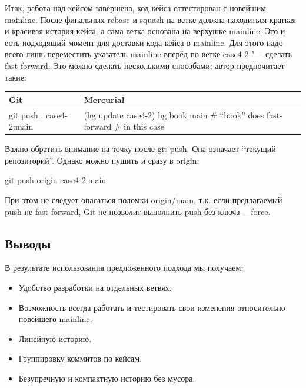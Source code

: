 \documentclass[10pt, a5paper]{article}
\begin{document}
Итак, работа над кейсом завершена, код кейса оттестирован с новейшим mainline. После финальных rebase и squash на ветке должна находиться краткая и красивая история кейса, а сама ветка основана на верхушке mainline. Это и есть подходящий момент для доставки кода кейса в mainline. Для этого надо всего лишь переместить указатель mainline вперёд по ветке case4-2 "--- сделать fast-forward. Это можно сделать несколькими способами; автор предпочитает такие:

\begin{table}
  \centering
  \begin{tabular}{|p{3.5cm}|p{6cm}|} \hline
    \textbf{Git}                       & \textbf{Mercurial}            \\ \hline
     git push . case4-2:main      & (hg update case4-2) \linebreak
                               hg book main \linebreak  \# ``book'' does fast-forward \linebreak
                               \# in this case                                               \\ \hline
  \end{tabular}
\end{table}
Важно обратить внимание на точку после git push. Она означает ``текущий репозиторий''. Однако можно пушить и сразу в origin:

git push origin case4-2:main

При этом не следует опасаться поломки origin/main, т.к. если предлагаемый push не fast-forward, Git не позволит выполнить push без ключа ---force.

\subsection*{Выводы}

В результате использования предложенного подхода мы получаем:

\begin{itemize}
  \item Удобство разработки на отдельных ветвях.
  \item Возможность всегда работать и тестировать свои изменения относительно новейшего mainline.
  \item Линейную историю.
  \item Группировку коммитов по кейсам.
  \item Безупречную и компактную историю без мусора.
\end{itemize}
\end{document}

